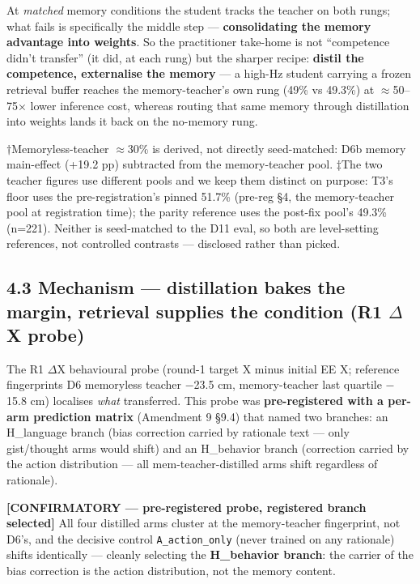 At \emph{matched} memory conditions the student tracks the teacher on both
rungs; what fails is specifically the middle step --- \textbf{consolidating the
memory advantage into weights}. So the practitioner take-home is not
``competence didn't transfer'' (it did, at each rung) but the sharper
recipe: \textbf{distil the competence, externalise the memory} --- a high-Hz
student carrying a frozen retrieval buffer reaches the memory-teacher's
own rung (49\% vs 49.3\%) at $\approx$50--75$\times$ lower inference cost, whereas
routing that same memory through distillation into weights lands it
back on the no-memory rung.

$\dagger$Memoryless-teacher $\approx$30\% is derived, not directly seed-matched: D6b
memory main-effect (+19.2 pp) subtracted from the memory-teacher pool.
$\ddagger$The two teacher figures use different pools and we keep them distinct
on purpose: T3's floor uses the pre-registration's pinned 51.7\%
(pre-reg \S4, the memory-teacher pool at registration time); the parity
reference uses the post-fix pool's 49.3\% (n=221). Neither is
seed-matched to the D11 eval, so both are level-setting references, not
controlled contrasts --- disclosed rather than picked.

\subsection*{4.3 Mechanism --- distillation bakes the margin, retrieval supplies the condition (R1 $\Delta$X probe)}

The R1 $\Delta$X behavioural probe (round-1 target X minus initial EE X;
reference fingerprints D6 memoryless teacher $-$23.5 cm, memory-teacher
last quartile $-$15.8 cm) localises \emph{what} transferred. This probe was
\textbf{pre-registered with a per-arm prediction matrix} (Amendment 9 \S9.4)
that named two branches: an H\_language branch (bias correction carried
by rationale text --- only gist/thought arms would shift) and an
H\_behavior branch (correction carried by the action distribution --- all
mem-teacher-distilled arms shift regardless of rationale).

\textbf{[CONFIRMATORY --- pre-registered probe, registered branch selected]}
All four distilled arms cluster at the memory-teacher fingerprint, not
D6's, and the decisive control \texttt{A\_action\_only} (never trained on any
rationale) shifts identically --- cleanly selecting the \textbf{H\_behavior
branch}: the carrier of the bias correction is the action
distribution, not the memory content.

